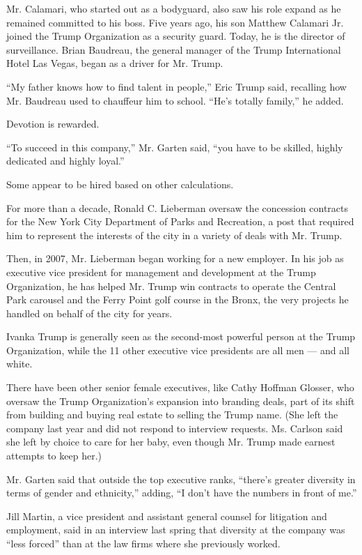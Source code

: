Mr. Calamari, who started out as a bodyguard, also saw his role expand
as he remained committed to his boss. Five years ago, his son Matthew
Calamari Jr. joined the Trump Organization as a security guard. Today,
he is the director of surveillance. Brian Baudreau, the general manager
of the Trump International Hotel Las Vegas, began as a driver for Mr.
Trump.

``My father knows how to find talent in people,'' Eric Trump said,
recalling how Mr. Baudreau used to chauffeur him to school. ``He's
totally family,'' he added.

Devotion is rewarded.

``To succeed in this company,'' Mr. Garten said, ``you have to be
skilled, highly dedicated and highly loyal.''

Some appear to be hired based on other calculations.

For more than a decade, Ronald C. Lieberman oversaw the concession
contracts for the New York City Department of Parks and Recreation, a
post that required him to represent the interests of the city in a
variety of deals with Mr. Trump.

Then, in 2007, Mr. Lieberman began working for a new employer. In his
job as executive vice president for management and development at the
Trump Organization, he has helped Mr. Trump win contracts to operate the
Central Park carousel and the Ferry Point golf course in the Bronx, the
very projects he handled on behalf of the city for years.

Ivanka Trump is generally seen as the second-most powerful person at the
Trump Organization, while the 11 other executive vice presidents are all
men --- and all white.

There have been other senior female executives, like Cathy Hoffman
Glosser, who oversaw the Trump Organization's expansion into branding
deals, part of its shift from building and buying real estate to selling
the Trump name. (She left the company last year and did not respond to
interview requests. Ms. Carlson said she left by choice to care for her
baby, even though Mr. Trump made earnest attempts to keep her.)

Mr. Garten said that outside the top executive ranks, ``there's greater
diversity in terms of gender and ethnicity,'' adding, ``I don't have the
numbers in front of me.''

Jill Martin, a vice president and assistant general counsel for
litigation and employment, said in an interview last spring that
diversity at the company was ``less forced'' than at the law firms where
she previously worked.

